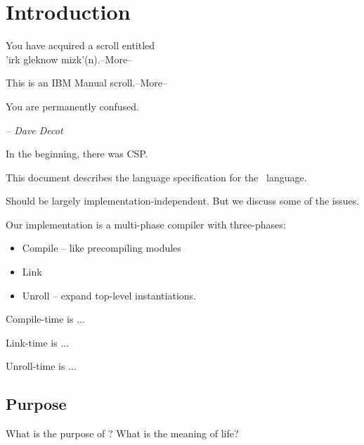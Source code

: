 

\chapter{Introduction}
\label{sec:intro}

\begin{flushright}
{ \ttfamily
You have acquired a scroll entitled\\
'irk gleknow mizk'(n).--More--

\medskip
This is an IBM Manual scroll.--More--

\medskip
You are permanently confused.

\bigskip
}	%
{\itshape -- Dave Decot}
\end{flushright}


In the beginning, there was CSP\cite{ref:csp}.

This document describes the language specification for the \artxx\ language.  

Should be largely implementation-independent.  
But we discuss some of the issues.  

Our implementation is a multi-phase compiler with three-phases:
\begin{itemize}
\item Compile -- like precompiling modules
\item Link
\item Unroll -- expand top-level instantiations.  
\end{itemize}

Compile-time is ...

Link-time is ...

Unroll-time is ...


\section{Purpose}
\label{sec:intro:purpose}

What is the purpose of \artxx?
What is the meaning of life?

